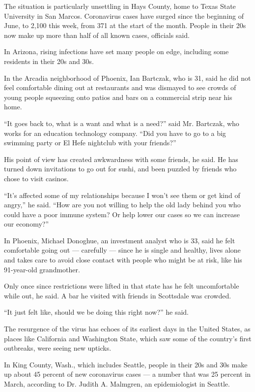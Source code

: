 The situation is particularly unsettling in Hays County, home to Texas
State University in San Marcos. Coronavirus cases have surged since the
beginning of June, to 2,100 this week, from 371 at the start of the
month. People in their 20s now make up more than half of all known
cases, officials said.

In Arizona, rising infections have set many people on edge, including
some residents in their 20s and 30s.

In the Arcadia neighborhood of Phoenix, Ian Bartczak, who is 31, said he
did not feel comfortable dining out at restaurants and was dismayed to
see crowds of young people squeezing onto patios and bars on a
commercial strip near his home.

``It goes back to, what is a want and what is a need?'' said Mr.
Bartczak, who works for an education technology company. ``Did you have
to go to a big swimming party or El Hefe nightclub with your friends?''

His point of view has created awkwardness with some friends, he said. He
has turned down invitations to go out for sushi, and been puzzled by
friends who chose to visit casinos.

``It's affected some of my relationships because I won't see them or get
kind of angry,'' he said. ``How are you not willing to help the old lady
behind you who could have a poor immune system? Or help lower our cases
so we can increase our economy?''

In Phoenix, Michael Donoghue, an investment analyst who is 33, said he
felt comfortable going out --- carefully --- since he is single and
healthy, lives alone and takes care to avoid close contact with people
who might be at risk, like his 91-year-old grandmother.

Only once since restrictions were lifted in that state has he felt
uncomfortable while out, he said. A bar he visited with friends in
Scottsdale was crowded.

``It just felt like, should we be doing this right now?'' he said.

The resurgence of the virus has echoes of its earliest days in the
United States, as places like California and Washington State, which saw
some of the country's first outbreaks, were seeing new upticks.

In King County, Wash., which includes Seattle, people in their 20s and
30s make up about 45 percent of new coronavirus cases --- a number that
was 25 percent in March, according to Dr. Judith A. Malmgren, an
epidemiologist in Seattle.


